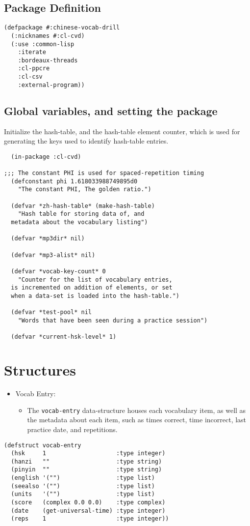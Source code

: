 \documentclass[11pt]{article}
\begin{document}
\subsection{Package Definition}
\label{sec-1-3}
\begin{verbatim}
(defpackage #:chinese-vocab-drill
  (:nicknames #:cl-cvd)
  (:use :common-lisp
	:iterate
	:bordeaux-threads
	:cl-ppcre
	:cl-csv
	:external-program))
\end{verbatim}

\subsection{Global variables, and setting the package}
\label{sec-1-4}
Initialize the hash-table, and the hash-table element counter, which is used for
generating the keys used to identify hash-table entries.
\begin{verbatim}
  (in-package :cl-cvd)

;;; The constant PHI is used for spaced-repetition timing
  (defconstant phi 1.618033988749895d0
    "The constant PHI, The golden ratio.")

  (defvar *zh-hash-table* (make-hash-table)
    "Hash table for storing data of, and
  metadata about the vocabulary listing")

  (defvar *mp3dir* nil)

  (defvar *mp3-alist* nil)

  (defvar *vocab-key-count* 0
    "Counter for the list of vocabulary entries,
  is incremented on addition of elements, or set
  when a data-set is loaded into the hash-table.")

  (defvar *test-pool* nil
    "Words that have been seen during a practice session")

  (defvar *current-hsk-level* 1)
\end{verbatim}

\section{Structures}
\label{sec-2}
\begin{itemize}
\item Vocab Entry:
\begin{itemize}
\item The \texttt{vocab-entry} data-structure houses each vocabulary item, as well as the
metadata about each item, such as times correct, time incorrect, last
practice date, and repetitions.
\end{itemize}
\end{itemize}
\begin{verbatim}
(defstruct vocab-entry
  (hsk     1                    :type integer)
  (hanzi   ""                   :type string)
  (pinyin  ""                   :type string)
  (english '("")                :type list)
  (seealso '("")                :type list)
  (units   '("")                :type list)
  (score   (complex 0.0 0.0)    :type complex)
  (date    (get-universal-time) :type integer)
  (reps    1                    :type integer))
\end{verbatim}
\end{document}
